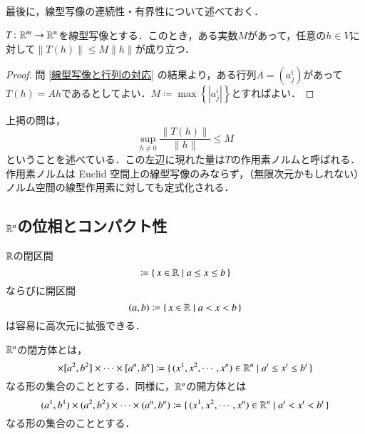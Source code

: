 最後に，線型写像の連続性・有界性について述べておく．

\begin{lem}\label{線型写像の連続性}
$T \colon \mathbb{R}^m \to \mathbb{R}^n$を線型写像とする．このとき，ある実数$M$があって，任意の$h \in V$に対して$\|T(h)\| \leq M \|h\|$が成り立つ．
\end{lem}

\begin{proof}
問 \ref{線型写像と行列の対応} の結果より，ある行列$A = \left(a^i_j\right)$があって$T(h) = Ah$であるとしてよい．$M \coloneqq \max \left\{\left|a^i_j\right|\right\} $とすればよい．
\end{proof}

\begin{que}[*]上掲の問は，
\begin{equation}
\sup_{h \neq 0} \frac{\|T(h)\|}{\|h\|} \leq M
\end{equation}
ということを述べている．この左辺に現れた量は$T$の作用素ノルムと呼ばれる．作用素ノルムは Euclid 空間上の線型写像のみならず，（無限次元かもしれない）ノルム空間の線型作用素に対しても定式化される．
\end{que}

\subsection{$\mathbb{R}^n$の位相とコンパクト性}

$\mathbb{R}$の閉区間
\begin{equation}
[a,b] \coloneqq \set{x \in \Real | a \leq x \leq b}
\end{equation}ならびに開区間
\begin{equation}
(a,b) \coloneqq \set{x \in \mathbb{R}| a < x < b}
\end{equation}
は容易に高次元に拡張できる．

\begin{defi}
$\mathbb{R}^n$の閉方体とは，
\begin{equation}
[a^1,b^1] \times [a^2, b^2] \times \cdots \times [a^n, b^n] \coloneqq \set{(x^1, x^2, \cdots, x^n) \in \Real^n | a^i \leq x^i \leq b^i }
\end{equation}なる形の集合のこととする．同様に，$\mathbb{R}^n$の開方体とは
\begin{equation}
(a^1,b^1) \times (a^2, b^2) \times \cdots \times (a^n, b^n) \coloneqq \set{(x^1, x^2, \cdots, x^n) \in \mathbb{R}^n | a^i < x^i < b^i }
\end{equation}なる形の集合のこととする．
\end{defi}

